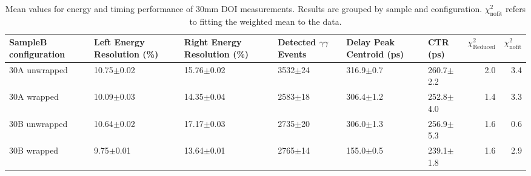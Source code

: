 \begin{table}
\caption{\label{tab:doictrresults} Mean values for energy and timing performance of 30mm DOI measurements. Results are grouped by sample and configuration. $\chi^2_\text{nofit}$ refers to fitting the weighted mean to the data.}
\begin{tabular}{llllllrr}
\hline
SampleB configuration & Left Energy Resolution (\%) & Right Energy Resolution (\%) & Detected $\gamma\gamma$ Events & Delay Peak Centroid (ps)  & CTR (ps) &  $\chi^2_\text{Reduced}$ &  $\chi^2_\text{nofit}$ \\
\hline
30A     unwrapped     &  10.75$\pm$0.02 &  15.76$\pm$0.02 &  3532$\pm$24 &  316.9$\pm$0.7 &  260.7$\pm$2.2 &        2.0 &    3.4 \\
30A     wrapped       &  10.09$\pm$0.03 &  14.35$\pm$0.04 &  2583$\pm$18 &  306.4$\pm$1.2 &  252.8$\pm$4.0 &        1.4 &    3.3 \\
30B     unwrapped     &  10.64$\pm$0.02 &  17.17$\pm$0.03 &  2735$\pm$20 &  306.0$\pm$1.3 &  256.9$\pm$5.3 &        1.6 &    0.6 \\
30B     wrapped       &   9.75$\pm$0.01 &  13.64$\pm$0.01 &  2765$\pm$14 &  155.0$\pm$0.5 &  239.1$\pm$1.8 &        1.6 &    2.9 \\
\hline
\end{tabular}
\end{table}

